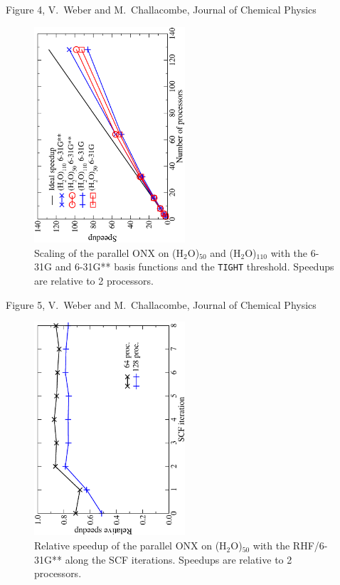 \documentclass[prl,preprint,doublespace]{revtex4} %
\begin{document}
{\clearpage
Figure 4, V.~Weber  and M.~Challacombe, Journal of Chemical Physics \\[1.cm]
\begin{figure}[h]
  \caption{\protect
    Scaling of the parallel ONX on (H$_2$O)$_{50}$
    and (H$_2$O)$_{110}$ with the 6-31G and 6-31G**
    basis functions and the {\tt TIGHT} threshold.
    Speedups are relative to 2 processors.
  }\label{fig:h2o_50_110}
\begin{center}
\includegraphics[angle=-90,width=0.5\textwidth]{h2o_50_110}
\end{center}

\end{figure}

\clearpage
Figure 5, V.~Weber  and M.~Challacombe, Journal of Chemical Physics \\[1.cm]
\begin{figure}[h]
  \caption{\protect
    Relative speedup of the parallel ONX on (H$_2$O)$_{50}$ with the RHF/6-31G**
    along the SCF iterations.
    Speedups are relative to 2 processors.
  }\label{fig:h2o_50_prop}
\begin{center}

\includegraphics[angle=-90,width=0.5\textwidth]{h2o_50_prop}
\end{center}


\end{figure}}
\end{document}
